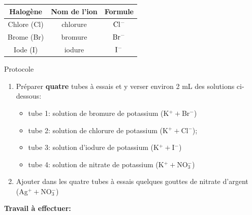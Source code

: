 \documentclass[french]{article}
\begin{document}
\begin{table}[ht]
	\centering

	\begin{tabular}{|c|c|c|}
		\hline
		\hspace{1cm}\textbf{Halogène} \hspace{1cm} & \hspace{1cm} \textbf{Nom de l'ion} \hspace{1cm} & \hspace{1cm} \textbf{Formule} \hspace{1cm} \\ \hline
		Chlore (Cl) & chlorure & $\rm Cl^{-}$\\ \hline
		Brome (Br)& bromure & $\rm Br^{-}$\\ \hline 
		Iode (I)& iodure & $\rm I^{-}$\\ \hline
	\end{tabular}
\end{table}
\begin{Protocol}{Protocole}
\begin{enumerate}

	\item Préparer \textbf{quatre} tubes à essais et y verser environ 2 mL des solutions ci-dessous:
 	\begin{itemize}
		\item tube 1: solution de bromure de potassium (K$^+ + $Br$^-$)
		\item tube 2: solution de chlorure de potassium (K$^+ + $Cl$^-$);
		\item tube 3: solution d'iodure de potassium (K$^+ + $I$^-$)
		\item tube 4: solution de nitrate de potassium (K$^+ + $NO$_{3}^-$)
	\end{itemize}
	\item Ajouter dans les quatre tubes à essais quelques gouttes de nitrate d'argent (Ag$^+ +$NO$_3^-$)
\end{enumerate}
\end{Protocol}

\noindent\textbf{Travail à effectuer:}
\end{document}
